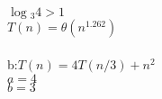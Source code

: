 \documentclass{article}
\begin{document}
                                                                                                                                                                                                                                                                                                                                                                                                                                                                                                                $\log{_3}{4} > 1$\\
                                                                                                                                                                                                                                                                                                                                                                                                                                                                                                                        $T(n) = \theta(n^1.262)$\\\\
                                                                                                                                                                                                                                                                                                                                                                                                                                                                                                                                b:$T(n) = 4T(n/3) + n^2$\\
                                                                                                                                                                                                                                                                                                                                                                                                                                                                                                                                        $a=4$\\
                                                                                                                                                                                                                                                                                                                                                                                                                                                                                                                                                $b=3$\\
\end{document}
